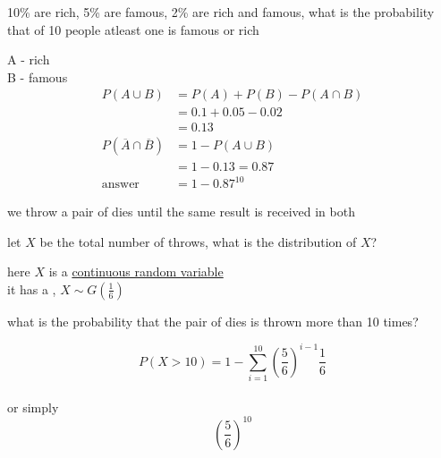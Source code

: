 \documentclass[a4paper,12pt]{article}
\begin{document}
\begin{question}
10\% are rich, 5\% are famous, 2\% are rich and famous, what is the probability that of 10 people atleast one is famous or rich\\
\begin{answer}
A - rich\\
B - famous\\
\begin{align*}
  P(A \cup B) &= P(A) + P(B) - P(A \cap B)\\
  &= 0.1 + 0.05 - 0.02\\
  &= 0.13\\
  P\left(\overline{A} \cap \overline{B}\right) &= 1 - P(A \cup B)\\
  &= 1 - 0.13 = 0.87\\
  \text{answer} &= 1 - 0.87^{10}
\end{align*}
\end{answer}
\end{question}
\begin{question}
we throw a pair of dies until the same result is received in both\\
\begin{subquestion}
let \(X\) be the total number of throws, what is the distribution of \(X\)?\\
\begin{answer}
here \(X\) is a \href{20230128192014-continuous_random_variable.org}{continuous random variable}\\
it has a , \(X \sim G\left(\frac{1}{6}\right)\)\\
\end{answer}
\end{subquestion}
\begin{subquestion}
what is the probability that the pair of dies is thrown more than 10 times?\\
\begin{answer}
\[
P(X>10)=1-\sum_{i=1}^{10} \left(\frac{5}{6}\right)^{i-1}\frac{1}{6}
\]\\
or simply\\
\[
\left(\frac{5}{6}\right)^{10}
\]\\
\end{answer}
\end{subquestion}
\end{question}
\end{document}
